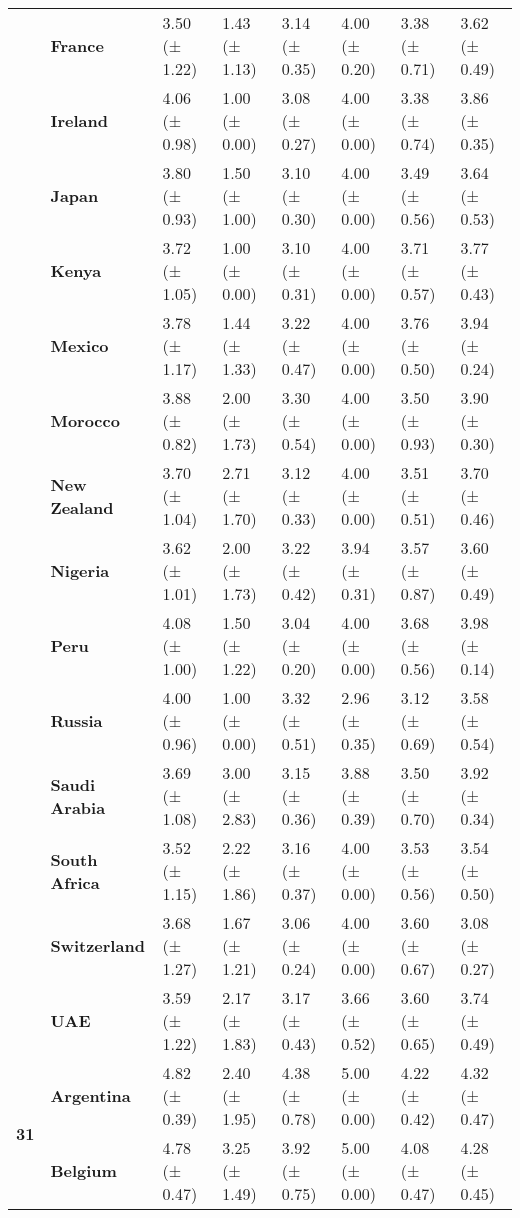 \begin{longtable}{llllllll}
\textbf{} & \textbf{France} & 3.50 (± 1.22) & 1.43 (± 1.13) & 3.14 (± 0.35) & 4.00 (± 0.20) & 3.38 (± 0.71) & 3.62 (± 0.49) \\
\textbf{} & \textbf{Ireland} & 4.06 (± 0.98) & 1.00 (± 0.00) & 3.08 (± 0.27) & 4.00 (± 0.00) & 3.38 (± 0.74) & 3.86 (± 0.35) \\
\textbf{} & \textbf{Japan} & 3.80 (± 0.93) & 1.50 (± 1.00) & 3.10 (± 0.30) & 4.00 (± 0.00) & 3.49 (± 0.56) & 3.64 (± 0.53) \\
\textbf{} & \textbf{Kenya} & 3.72 (± 1.05) & 1.00 (± 0.00) & 3.10 (± 0.31) & 4.00 (± 0.00) & 3.71 (± 0.57) & 3.77 (± 0.43) \\
\textbf{} & \textbf{Mexico} & 3.78 (± 1.17) & 1.44 (± 1.33) & 3.22 (± 0.47) & 4.00 (± 0.00) & 3.76 (± 0.50) & 3.94 (± 0.24) \\
\textbf{} & \textbf{Morocco} & 3.88 (± 0.82) & 2.00 (± 1.73) & 3.30 (± 0.54) & 4.00 (± 0.00) & 3.50 (± 0.93) & 3.90 (± 0.30) \\
\textbf{} & \textbf{New Zealand} & 3.70 (± 1.04) & 2.71 (± 1.70) & 3.12 (± 0.33) & 4.00 (± 0.00) & 3.51 (± 0.51) & 3.70 (± 0.46) \\
\textbf{} & \textbf{Nigeria} & 3.62 (± 1.01) & 2.00 (± 1.73) & 3.22 (± 0.42) & 3.94 (± 0.31) & 3.57 (± 0.87) & 3.60 (± 0.49) \\
\textbf{} & \textbf{Peru} & 4.08 (± 1.00) & 1.50 (± 1.22) & 3.04 (± 0.20) & 4.00 (± 0.00) & 3.68 (± 0.56) & 3.98 (± 0.14) \\
\textbf{} & \textbf{Russia} & 4.00 (± 0.96) & 1.00 (± 0.00) & 3.32 (± 0.51) & 2.96 (± 0.35) & 3.12 (± 0.69) & 3.58 (± 0.54) \\
\textbf{} & \textbf{Saudi Arabia} & 3.69 (± 1.08) & 3.00 (± 2.83) & 3.15 (± 0.36) & 3.88 (± 0.39) & 3.50 (± 0.70) & 3.92 (± 0.34) \\
\textbf{} & \textbf{South Africa} & 3.52 (± 1.15) & 2.22 (± 1.86) & 3.16 (± 0.37) & 4.00 (± 0.00) & 3.53 (± 0.56) & 3.54 (± 0.50) \\
\textbf{} & \textbf{Switzerland} & 3.68 (± 1.27) & 1.67 (± 1.21) & 3.06 (± 0.24) & 4.00 (± 0.00) & 3.60 (± 0.67) & 3.08 (± 0.27) \\
\textbf{} & \textbf{UAE} & 3.59 (± 1.22) & 2.17 (± 1.83) & 3.17 (± 0.43) & 3.66 (± 0.52) & 3.60 (± 0.65) & 3.74 (± 0.49) \\
\cline{1-8}
\multirow[t]{19}{*}{\textbf{31}} & \textbf{Argentina} & 4.82 (± 0.39) & 2.40 (± 1.95) & 4.38 (± 0.78) & 5.00 (± 0.00) & 4.22 (± 0.42) & 4.32 (± 0.47) \\
\textbf{} & \textbf{Belgium} & 4.78 (± 0.47) & 3.25 (± 1.49) & 3.92 (± 0.75) & 5.00 (± 0.00) & 4.08 (± 0.47) & 4.28 (± 0.45) \\

\end{longtable}
